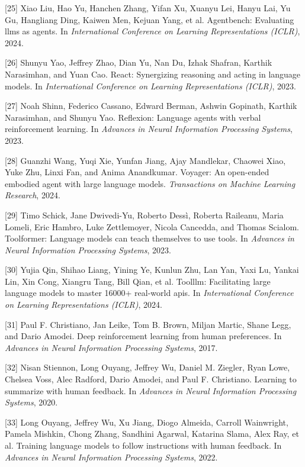 \documentclass{article}
\begin{document}
[25] Xiao Liu, Hao Yu, Hanchen Zhang, Yifan Xu, Xuanyu Lei, Hanyu
Lai, Yu Gu, Hangliang Ding, Kaiwen Men, Kejuan Yang, et al.
Agentbench: Evaluating llms as agents. In \textit{International
Conference on Learning Representations (ICLR)}, 2024.

[26] Shunyu Yao, Jeffrey Zhao, Dian Yu, Nan Du, Izhak Shafran,
Karthik Narasimhan, and Yuan Cao. React: Synergizing reasoning
and acting in language models. In \textit{International
Conference on Learning Representations (ICLR)}, 2023.

[27] Noah Shinn, Federico Cassano, Edward Berman, Ashwin
Gopinath, Karthik Narasimhan, and Shunyu Yao. Reflexion: Language
agents with verbal reinforcement learning. In \textit{Advances in
Neural Information Processing Systems}, 2023.

[28] Guanzhi Wang, Yuqi Xie, Yunfan Jiang, Ajay Mandlekar,
Chaowei Xiao, Yuke Zhu, Linxi Fan, and Anima Anandkumar. Voyager:
An open-ended embodied agent with large language models.
\textit{Transactions on Machine Learning Research}, 2024.

[29] Timo Schick, Jane Dwivedi-Yu, Roberto Dess\`i, Roberta
Raileanu, Maria Lomeli, Eric Hambro, Luke Zettlemoyer, Nicola
Cancedda, and Thomas Scialom. Toolformer: Language models can
teach themselves to use tools. In \textit{Advances in Neural
Information Processing Systems}, 2023.

[30] Yujia Qin, Shihao Liang, Yining Ye, Kunlun Zhu, Lan Yan,
Yaxi Lu, Yankai Lin, Xin Cong, Xiangru Tang, Bill Qian, et al.
Toolllm: Facilitating large language models to master 16000+
real-world apis. In \textit{International Conference on Learning
Representations (ICLR)}, 2024.

[31] Paul F. Christiano, Jan Leike, Tom B. Brown, Miljan Martic,
Shane Legg, and Dario Amodei. Deep reinforcement learning from
human preferences. In \textit{Advances in Neural Information
Processing Systems}, 2017.

[32] Nisan Stiennon, Long Ouyang, Jeffrey Wu, Daniel M. Ziegler,
Ryan Lowe, Chelsea Voss, Alec Radford, Dario Amodei, and Paul F.
Christiano. Learning to summarize with human feedback. In
\textit{Advances in Neural Information Processing Systems},
2020.

[33] Long Ouyang, Jeffrey Wu, Xu Jiang, Diogo Almeida, Carroll
Wainwright, Pamela Mishkin, Chong Zhang, Sandhini Agarwal,
Katarina Slama, Alex Ray, et al. Training language models to
follow instructions with human feedback. In \textit{Advances in
Neural Information Processing Systems}, 2022.
\end{document}
